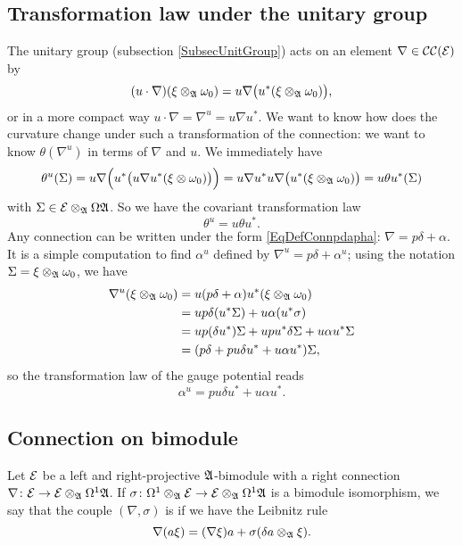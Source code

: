 \subsection{Transformation law under the unitary group}

The unitary group (subsection \ref{SubsecUnitGroup}) acts on an element $\nabla\in\mathcal{CC}(\mathcal{E})$ by
\begin{equation}
(u\cdot\nabla)(\xi\otimes_{\mathfrak{A}}\omega_0)=u\nabla\big( u^*(\xi\otimes_{\mathfrak{A}}\omega_0) \big),
\end{equation}
or in a more compact way $u\cdot\nabla=\nabla^u=u\nabla u^*$. We want to know how does the curvature change under such a transformation of the connection: we want to know $\theta(\nabla^u)$ in terms of $\nabla$ and $u$. We immediately have
\[ 
  \theta^u(\Sigma)=u\nabla\Big( u^*\big( u\nabla u^*(\xi\otimes\omega_0) \big) \Big)=u\nabla u^*u\nabla\big( u^*(\xi\otimes_{\mathfrak{A}}\omega_0) \big)=u\theta u^*(\Sigma)
\]
with $\Sigma\in\mathcal{E}\otimes_{\mathfrak{A}}\Omega\mathfrak{A}$. So we have the covariant transformation law 
\begin{equation}
\theta^u=u\theta u^*. 
\end{equation}
Any connection can be written under the form \eqref{EqDefConnpdapha}: $\nabla=p\delta+\alpha$. It is a simple computation to find $\alpha^u$ defined by $\nabla^u=p\delta+\alpha^u$; using the notation $\Sigma=\xi\otimes_{\mathfrak{A}}\omega_0$, we have
\begin{align*}
\nabla^u(\xi\otimes_{\mathfrak{A}}\omega_0) & = u(p\delta+\alpha)u^*(\xi\otimes_{\mathfrak{A}}\omega_0)\\
		& = up\delta(u^*\Sigma)+u\alpha(u^*\sigma)\\
		& = up(\delta u^*)\Sigma+upu^*\delta\Sigma+u\alpha u^*\Sigma\\
		& = (p\delta+pu\delta u^*+u\alpha u^*)\Sigma,
\end{align*}
so the transformation law of the gauge potential reads
\begin{equation}
\alpha^u=pu\delta u^*+u\alpha u^*.
\end{equation}

\subsection{Connection on bimodule} 

Let $\mathcal{E}$ be a left and right-projective $\mathfrak{A}$-bimodule with a right connection $\nabla\colon \mathcal{E}\to \mathcal{E}\otimes_{\mathfrak{A}}\Omega^1\mathfrak{A}$. If $\sigma\colon \Omega^1\otimes_{\mathfrak{A}}\mathcal{E}\to \mathcal{E}\otimes_{\mathfrak{A}}\Omega^1\mathfrak{A}$ is a bimodule isomorphism, we say that the couple $(\nabla,\sigma)$ is  if we have the Leibnitz rule
\begin{equation}
\nabla(a\xi)=(\nabla\xi)a+\sigma(\delta a\otimes_{\mathfrak{A}}\xi).
\end{equation}

